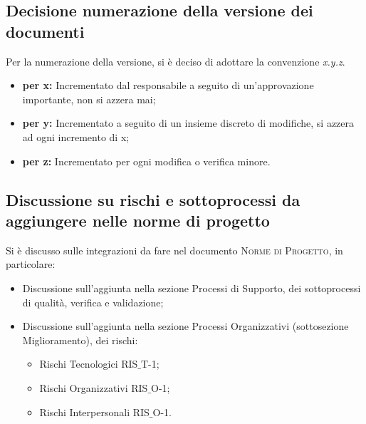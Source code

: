 \subsection{Decisione numerazione della versione dei documenti}
Per la numerazione della versione, si è deciso di adottare la convenzione \textit{x.y.z}.\\
\begin{itemize}
	\item \textbf{{per x:}} Incrementato dal responsabile a seguito di un’approvazione importante, non si azzera mai;
	\item \textbf{{per y:}} Incrementato a seguito di un insieme discreto di modifiche, si azzera ad ogni incremento di x;
	\item \textbf{{per z:}} Incrementato per ogni modifica o verifica minore.
\end{itemize}
\subsection{Discussione su rischi e sottoprocessi da aggiungere nelle norme di progetto}
Si è discusso sulle integrazioni da fare nel documento \textsc{Norme di Progetto}, in particolare:
\begin{itemize}
	\item Discussione sull'aggiunta nella sezione Processi di Supporto, dei sottoprocessi di qualità, verifica e validazione;
	\item Discussione sull'aggiunta nella sezione Processi Organizzativi (sottosezione Miglioramento), dei rischi:
	\begin{itemize}
		\item Rischi Tecnologici RIS$\_$T-1;
		\item Rischi Organizzativi RIS$\_$O-1;
		\item Rischi Interpersonali RIS$\_$O-1.
	\end{itemize}
\end{itemize}
\pagebreak
